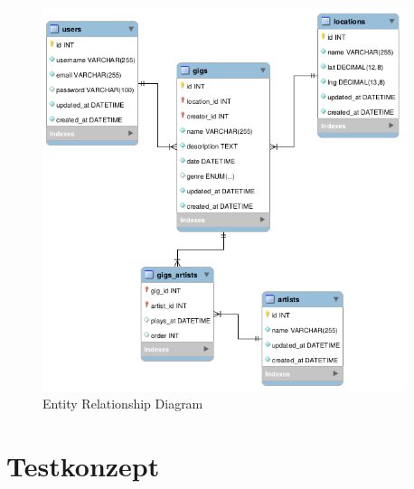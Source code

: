 \begin{figure}[!htb]
  \centering
  \includegraphics[width=0.95\textwidth]{konzept/erd.png}
  \caption{Entity Relationship Diagram}
\end{figure}

\section{Testkonzept}\label{testkonzept}
